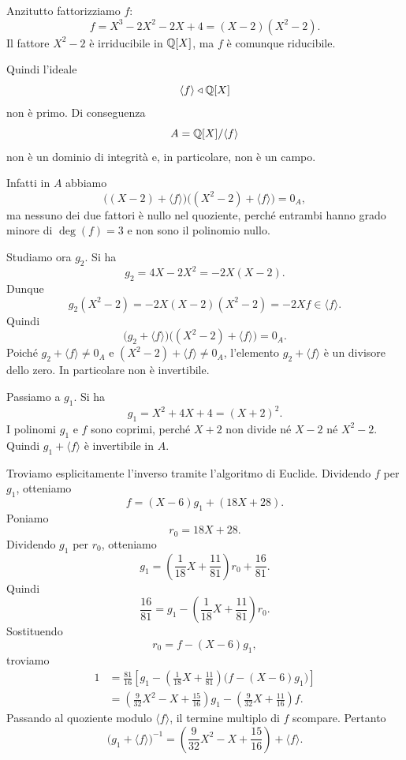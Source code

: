 \documentclass[a4paper]{article}
\begin{document}
\begin{radioactive}
\begin{snippetsolution}{}
    Anzitutto fattorizziamo \(f\):
    \[
        f=X^3-2X^2-2X+4=(X-2)(X^2-2).
    \]
    Il fattore \(X^2-2\) è irriducibile in \(\mathbb{Q}[X]\), ma \(f\) è comunque riducibile.

    Quindi l'ideale
    \[
        \langle f \rangle\triangleleft \mathbb{Q}[X]
    \]
    non è primo. Di conseguenza
    \[
        A=\mathbb{Q}[X]/\langle f \rangle
    \]
    non è un dominio di integrità e, in particolare, non è un campo.

    Infatti in \(A\) abbiamo
    \[
        \big((X-2)+\langle f \rangle\big)\big((X^2-2)+\langle f \rangle\big)=0_A,
    \]
    ma nessuno dei due fattori è nullo nel quoziente, perché entrambi hanno grado minore di \(\deg(f)=3\) e non sono il polinomio nullo.

    Studiamo ora \(g_2\). Si ha
    \[
        g_2=4X-2X^2=-2X(X-2).
    \]
    Dunque
    \[
        g_2(X^2-2)=-2X(X-2)(X^2-2)=-2Xf\in\langle f \rangle.
    \]
    Quindi
    \[
        \big(g_2+\langle f \rangle\big)\big((X^2-2)+\langle f \rangle\big)=0_A.
    \]
    Poiché \(g_2+\langle f \rangle\neq 0_A\) e \((X^2-2)+\langle f \rangle\neq 0_A\), l'elemento \(g_2+\langle f \rangle\) è un divisore dello zero. In particolare non è invertibile.

    Passiamo a \(g_1\). Si ha
    \[
        g_1=X^2+4X+4=(X+2)^2.
    \]
    I polinomi \(g_1\) e \(f\) sono coprimi, perché \(X+2\) non divide né \(X-2\) né \(X^2-2\). Quindi \(g_1+\langle f \rangle\) è invertibile in \(A\).

    Troviamo esplicitamente l'inverso tramite l'algoritmo di Euclide. Dividendo \(f\) per \(g_1\), otteniamo
    \[
        f=(X-6)g_1+(18X+28).
    \]
    Poniamo
    \[
        r_0=18X+28.
    \]
    Dividendo \(g_1\) per \(r_0\), otteniamo
    \[
        g_1=
        \left(\frac{1}{18}X+\frac{11}{81}\right)r_0+\frac{16}{81}.
    \]
    Quindi
    \[
        \frac{16}{81}
        =
        g_1-
        \left(\frac{1}{18}X+\frac{11}{81}\right)r_0.
    \]
    Sostituendo
    \[
        r_0=f-(X-6)g_1,
    \]
    troviamo
    \begin{align*}
        1
        &=
        \frac{81}{16}
        \left[
            g_1-
            \left(\frac{1}{18}X+\frac{11}{81}\right)
            \big(f-(X-6)g_1\big)
        \right] \\
        &=
        \left(
            \frac{9}{32}X^2-X+\frac{15}{16}
        \right)g_1
        -
        \left(
            \frac{9}{32}X+\frac{11}{16}
        \right)f.
    \end{align*}
    Passando al quoziente modulo \(\langle f \rangle\), il termine multiplo di \(f\) scompare. Pertanto
    \[
        \big(g_1+\langle f \rangle\big)^{-1}
        =
        \left(
            \frac{9}{32}X^2-X+\frac{15}{16}
        \right)+\langle f \rangle.
    \]


\end{snippetsolution}
\end{radioactive}
\end{document}
